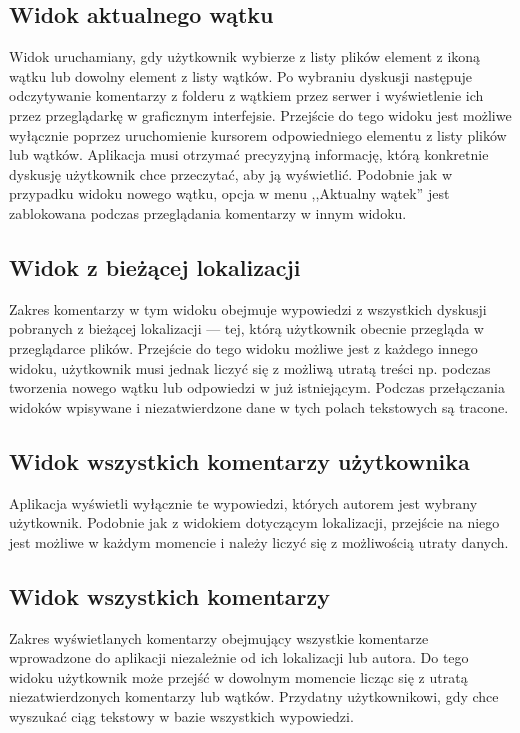 \documentclass[polish,a4paper,twoside]{ppfcmthesis}
\begin{document}
\subsection*{Widok aktualnego wątku}

Widok uruchamiany, gdy użytkownik wybierze z listy plików element z ikoną wątku lub dowolny element z listy wątków. Po wybraniu dyskusji następuje odczytywanie komentarzy z folderu z wątkiem przez serwer i wyświetlenie ich przez przeglądarkę w graficznym interfejsie. Przejście do tego widoku jest możliwe wyłącznie poprzez uruchomienie kursorem odpowiedniego elementu z listy plików lub wątków. Aplikacja musi otrzymać precyzyjną informację, którą konkretnie dyskusję użytkownik chce przeczytać, aby ją wyświetlić. Podobnie jak w przypadku widoku nowego wątku, opcja w menu ,,Aktualny wątek'' jest zablokowana podczas przeglądania komentarzy w innym widoku.
  
\subsection*{Widok z bieżącej lokalizacji}
  
Zakres komentarzy w tym widoku obejmuje wypowiedzi z wszystkich dyskusji pobranych z bieżącej lokalizacji --- tej, którą użytkownik obecnie przegląda w przeglądarce plików. Przejście do tego widoku możliwe jest z każdego innego widoku, użytkownik musi jednak liczyć się z możliwą utratą treści np. podczas tworzenia nowego wątku lub odpowiedzi w już istniejącym. Podczas przełączania widoków wpisywane i niezatwierdzone dane w tych polach tekstowych są tracone.

\subsection*{Widok wszystkich komentarzy użytkownika}

Aplikacja wyświetli wyłącznie te wypowiedzi, których autorem jest wybrany użytkownik. Podobnie jak z widokiem dotyczącym lokalizacji, przejście na niego jest możliwe w każdym momencie i należy liczyć się z możliwością utraty danych.

\subsection*{Widok wszystkich komentarzy}

Zakres wyświetlanych komentarzy obejmujący wszystkie komentarze wprowadzone do aplikacji niezależnie od ich lokalizacji lub autora. Do tego widoku użytkownik może przejść w dowolnym momencie licząc się z utratą niezatwierdzonych komentarzy lub wątków. Przydatny użytkownikowi, gdy chce wyszukać ciąg tekstowy w bazie wszystkich wypowiedzi.
\end{document}
